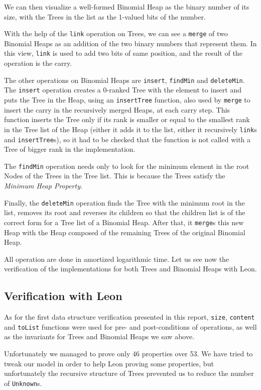 We can then visualize a well-formed Binomial Heap as the binary number of its size, 
with the Trees in the list as the 1-valued bits of the number.

With the help of the \verb|link| operation on Trees, 
we can see a \verb|merge| of two Binomial Heaps 
as an addition of the two binary numbers that represent them.
In this view, \verb|link| is used to add two bits of same position,
and the result of the operation is the carry.

The other operations on Binomial Heaps are \verb|insert|, \verb|findMin| and \verb|deleteMin|. 
The \verb|insert| operation creates a 0-ranked Tree with the element to insert 
and puts the Tree in the Heap, using an \verb|insertTree| function, 
also used by \verb|merge| to insert the carry in the recursively merged Heaps,
at each carry step.
This function inserts the Tree only if its rank is smaller or equal to the smallest rank in the Tree list of the Heap 
(either it adds it to the list, either it recursively \verb|link|s and \verb|insertTree|s),
so it had to be checked that the function is not called with a Tree of bigger rank in the implementation.

The \verb|findMin| operation needs only to look for the minimum element 
in the root Nodes of the Trees in the Tree list.
This is because the Trees satisfy the \emph{Minimum Heap Property}.

Finally, the \verb|deleteMin| operation finds the Tree with the minimum root in the list,
removes its root 
and reverses its children so that the children list is of the correct form for a Tree list of a Binomial Heap.
After that, it \verb|merge|s this new Heap with the Heap composed of 
the remaining Trees of the original Binomial Heap.

All operation are done in amortized logarithmic time.
Let us see now the verification of the implementations 
for both Trees and Binomial Heaps with Leon.

\subsection{Verification with Leon}
As for the first data structure verification presented in this report,
 \verb|size|, \verb|content| and \verb|toList| functions were used
 for pre- and post-conditions of operations,
as well as the invariants for Trees and Binomial Heaps we saw above.

Unfortunately we managed to prove only 46 properties over 53. 
We have tried to tweak our model in order to help Leon proving some properties,
but unfortunately the recursive structure of Trees prevented us to reduce the number of \verb|Unknown|s.

